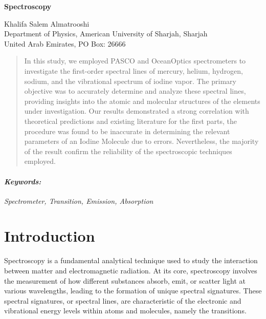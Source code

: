 \documentclass[12pt]{article}
\begin{document}
	
	\begin{titlepage}
		\begin{center}
			\begin{Large}
				\textbf{Spectroscopy} \\
			\end{Large}
			\vspace{0.5cm}
			Khalifa Salem Almatrooshi \\
			\vspace{0.5cm}
			Department of Physics, American University of Sharjah, Sharjah \\
			United Arab Emirates, PO Box: 26666
		\end{center}
		\begin{abstract}
			\noindent
			In this study, we employed PASCO and OceanOptics spectrometers to investigate the first-order spectral lines of mercury, helium, hydrogen, sodium, and the vibrational spectrum of iodine vapor. The primary objective was to accurately determine and analyze these spectral lines, providing insights into the atomic and molecular structures of the elements under investigation. Our results demonstrated a strong correlation with theoretical predictions and existing literature for the first parts, the procedure was found to be inaccurate in determining the relevant parameters of an Iodine Molecule due to errors. Nevertheless, the majority of the result confirm the reliability of the spectroscopic techniques employed.
		\end{abstract}
		\paragraph{\textit{Keywords:}} \textit{Spectrometer, Transition, Emission, Absorption}
	\end{titlepage}
	
\clearpage
	
	\section{Introduction}	

	Spectroscopy is a fundamental analytical technique used to study the interaction between matter and electromagnetic radiation. At its core, spectroscopy involves the measurement of how different substances absorb, emit, or scatter light at various wavelengths, leading to the formation of unique spectral signatures. These spectral signatures, or spectral lines, are characteristic of the electronic and vibrational energy levels within atoms and molecules, namely the transitions.
	
\end{document}
